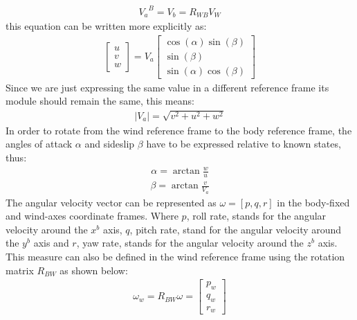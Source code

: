 \documentclass[conference]{IEEEtran}
\begin{document}
\begin{align}
    {V_a}^B={V_b}={R_{WB}V_W}
    \label{TrueAirspeedMatrixForm}
\end{align}
this equation can be written more explicitly as:
\begin{align}
    {\begin{bmatrix}
             u \\
             v \\w
         \end{bmatrix}}=V_a{\begin{bmatrix}
                            \cos(\alpha)\sin(\beta) \\
                            \sin(\beta)             \\
                            \sin(\alpha)\cos(\beta)
                        \end{bmatrix}}
    \label{TrueAirspeedComplete}
\end{align}
Since we are just expressing the same value in a different reference frame its module should remain the same, this means:
\begin{align}
    {\lvert V_a \rvert}=\sqrt{v^2+u^2+w^2}
    \label{TrueAirspeedModule}
\end{align}
In order to rotate from the wind reference frame to the body reference frame, the angles of attack $\alpha$ and sideslip $\beta$ have to be expressed relative to known states, thus:
\begin{align}
    {\alpha}=\arctan{\frac{w}{u}}
    \label{AlphaFormula}
\end{align}
\begin{align}
    {\beta}=\arctan{\frac{v}{V_a}}
    \label{BetaFormula}
\end{align}
The angular velocity vector can be represented as $\omega={[p,q,r]}$ in the body-fixed and wind-axes coordinate frames.
Where $p$, roll rate, stands for the angular velocity around the $x^b$ axis, $q$, pitch rate, stand for the angular velocity around the $y^b$ axis and $r$, yaw rate, stands for the angular velocity around the $z^b$ axis.
This measure can also be defined in the wind reference frame using the rotation matrix $R_{BW}$ as shown below:
\begin{align}
    \omega_w=R_{BW}\omega=\begin{bmatrix}
                              p_w \\
                              q_w \\
                              r_w
                          \end{bmatrix}
    \label{AngularVelocityInWind}
\end{align}
\end{document}
